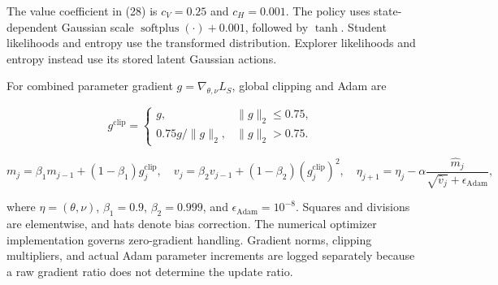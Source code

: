 \documentclass[
  american,
  11pt,
  a4paper,
]{article}
\begin{document}
The value coefficient in (28) is \(c_V=0.25\) and \(c_H=0.001\). The
policy uses state-dependent Gaussian scale
\(\operatorname{softplus}(\cdot)+0.001\), followed by \(\tanh\). Student
likelihoods and entropy use the transformed distribution. Explorer
likelihoods and entropy instead use its stored latent Gaussian actions.

For combined parameter gradient \(g=\nabla_{\theta,\nu}L_S\), global
clipping and Adam are

\[
g^{\mathrm{clip}}=
\begin{cases}
g,&\|g\|_2\le0.75,\\
0.75g/\|g\|_2,&\|g\|_2>0.75.
\end{cases}
\tag{55}\label{eq:55}
\]

\[
m_j=\beta_1m_{j-1}+(1-\beta_1)g_j^{\mathrm{clip}},\quad
v_j=\beta_2v_{j-1}+(1-\beta_2)(g_j^{\mathrm{clip}})^2,\quad
\eta_{j+1}=\eta_j-\alpha\frac{\widehat m_j}{\sqrt{\widehat v_j}+\epsilon_{\mathrm{Adam}}},
\tag{56}\label{eq:56}
\]

where \(\eta=(\theta,\nu)\), \(\beta_1=0.9\), \(\beta_2=0.999\), and
\(\epsilon_{\mathrm{Adam}}=10^{-8}\). Squares and divisions are
elementwise, and hats denote bias correction. The numerical optimizer
implementation governs zero-gradient handling. Gradient norms, clipping
multipliers, and actual Adam parameter increments are logged separately
because a raw gradient ratio does not determine the update ratio.
\end{document}
